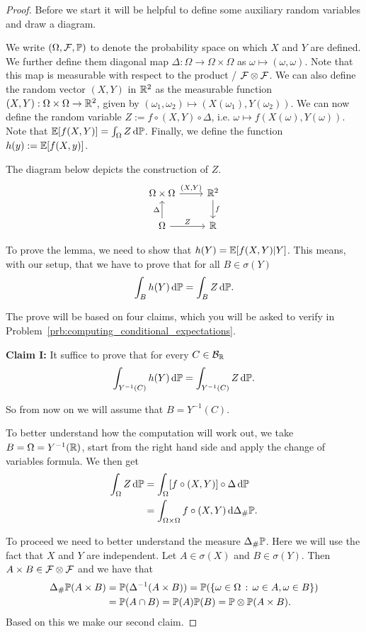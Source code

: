 \begin{proof}
Before we start it will be helpful to define some auxiliary random variables and draw a diagram.

We write $(\Omega, \mathcal F, \mathbb P)$ to denote the probability space on which $X$ and $Y$ are defined. We further define them diagonal map $\Delta : \Omega \to \Omega \times \Omega$ as $\omega \mapsto (\omega, \omega)$. Note that this map is measurable with respect to the product \sigalg/ $\mathcal F \otimes \mathcal F$. We can also define the random vector $(X,Y)$ in $\mathbb R^2$ as the measurable function $(X, Y) : \Omega \times \Omega \to \mathbb R^2$, given by $(\omega_1, \omega_2) \mapsto (X(\omega_1), Y(\omega_2))$. We can now define the random variable $Z := f \circ (X, Y) \circ \Delta$, i.e. $\omega \mapsto f(X(\omega), Y(\omega))$. Note that $\mathbb E[f(X,Y)] = \int_\Omega Z \, \mathrm{d} \mathbb P$. Finally, we define the function $h(y) := \mathbb E[f(X,y)]$.

The diagram below depicts the construction of $Z$.
\[
\begin{tikzcd}
	\Omega \times \Omega \arrow[r,"{(X,Y)}"] &\bbR^2 \arrow[d,"f"]  \\
	\Omega \arrow[u, "\Delta"] \arrow[r, "Z"] &\bbR
\end{tikzcd}
\]

To prove the lemma, we need to show that $h(Y) = \mathbb E[f(X,Y)|Y]$. This means, with our setup, that we have to prove that for all $B \in \sigma(Y)$ 
\[
	\int_B h(Y) \, \mathrm{d} \mathbb P = \int_B Z \, \mathrm{d} \mathbb P.
\]

The prove will be based on four claims, which you will be asked to verify in Problem~\ref{prb:computing_conditional_expectations}.

\textbf{Claim I:} It suffice to prove that for every $C \in \mathcal B_{\mathbb R}$
\[
	\int_{Y^{-1}(C)} h(Y) \, \mathrm{d} \mathbb P = \int_{Y^{-1}(C)} Z \, \mathrm{d} \mathbb P.
\]

So from now on we will assume that $B = Y^{-1}(C)$.

To better understand how the computation will work out, we take $B = \Omega = Y^{-1}(\mathbb R)$, start from the right hand side and apply the change of variables formula. We then get
\begin{align*}
	\int_\Omega Z \, \mathrm{d} \mathbb P &= \int_\Omega [f \circ (X, Y)] \circ \Delta \, \mathrm{d} \mathbb P \\
	&= \int_{\Omega \times \Omega} f \circ (X,Y) \, \mathrm{d} \Delta_\# \mathbb P.
\end{align*}

To proceed we need to better understand the measure $\Delta_\# \mathbb P$. Here we will use the fact that $X$ and $Y$ are independent. Let $A \in \sigma(X)$ and $B \in \sigma(Y)$. Then $A \times B \in \mathcal F \otimes \mathcal F$ and we have that
\begin{align*}
	\Delta_\# \mathbb P(A \times B) &= \mathbb P(\Delta^{-1}(A \times B))
		= \mathbb P(\{\omega \in \Omega \, : \, \omega \in A, \omega \in B\})\\
	&= \mathbb P(A \cap B) = \mathbb P(A) \mathbb P(B) = \mathbb P\otimes \mathbb P(A\times B).
\end{align*}
Based on this we make our second claim.


\end{proof}
